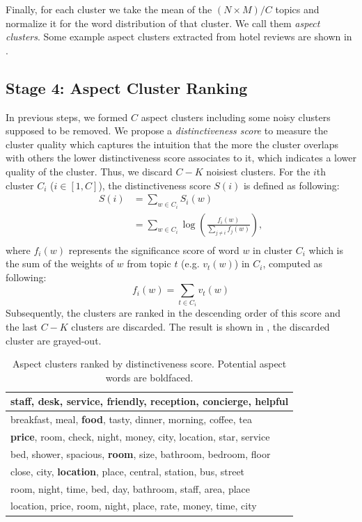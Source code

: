 Finally, for each cluster we take the mean of the $(N\times M)/C$ topics and normalize it
for the word distribution of that cluster.
We call them {\em aspect clusters}.
Some example aspect clusters extracted from hotel reviews are 
shown in .

\subsection{Stage 4: Aspect Cluster Ranking}
In previous steps, we formed $C$ aspect clusters including some noisy clusters supposed to be removed.  
We propose a {\em distinctiveness score} to measure the cluster quality which captures 
the intuition that the more the cluster overlaps with others the lower distinctiveness score associates to it, which indicates a lower quality of the cluster. 
Thus, we discard $C-K$ noisiest clusters. 
For the $i$th cluster $C_i$ ($i\in [1, C]$), 
the distinctiveness score $S(i)$ is defined as following:
\begin{align}
S(i) &= \sum_{w\in C_i} S_i(w) \nonumber\\ 
     &= \sum_{w\in C_i} \log\left(\frac{f_i(w)}{\sum_{j\neq i} f_j(w)}\right)\nonumber, \\
\end{align}
where $f_i(w)$ represents the significance score of word $w$ in cluster $C_i$ which is the sum of the weights of $w$ from topic $t$ (e.g. $v_t(w)$) in $C_i$, computed as following: 
\begin{equation}
    f_i(w) = \sum_{t\in C_i} v_t(w)
\end{equation}
Subsequently, the clusters are ranked in the descending order of 
this score and the last $C-K$ clusters are discarded.
The result is shown in , 
the discarded cluster are grayed-out.

\begin{table}[th]
\caption{Aspect clusters ranked by distinctiveness score.
Potential aspect words are boldfaced.}
\label{table:clustersranked}
\centering
\begin{tabular}{|l|} \hline
\textbf{staff}, desk, \textbf{service}, friendly, reception, concierge, helpful \\\hline
breakfast, meal, \textbf{food}, tasty, dinner, morning, coffee, tea \\\hline
\textbf{price}, room, check, night, money, city, location, star, service \\\hline
bed, shower, spacious, \textbf{room}, size, bathroom, bedroom, floor \\\hline
close, city, \textbf{location}, place, central, station, bus, street \\\hline
\textcolor{mygray}{room, night, time, bed, day, bathroom, staff, area, place} \\\hline
\textcolor{mygray}{location, price, room, night, place, rate, money, time, city} \\\hline
\end{tabular}
\end{table}

